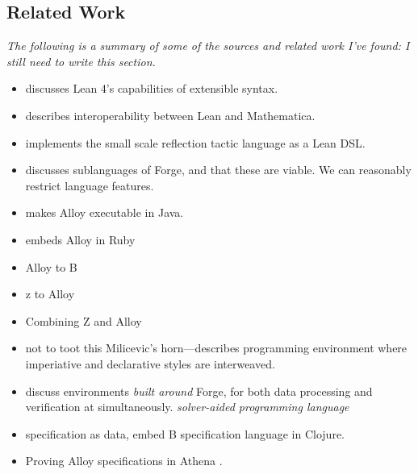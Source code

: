 \subsection{Related Work}
\emph{The following is a summary of some of the sources and related work I've found: I still need to write this section.}
\begin{itemize}
    \item \cite{ullrich2022beyond} discusses Lean 4's capabilities of extensible syntax. 
    \item \cite{lewis2022bi} describes interoperability between Lean and Mathematica. 
    \item \cite{gladshtein2024small} implements the small scale reflection tactic language as a Lean DSL. 
    \item \cite{ngpdbccdlrrvwwk-oopsla-2024} discusses sublanguages of Forge, and that these are viable. We can reasonably restrict language features. 
    \item \cite{milicevic2010executable} makes Alloy executable in Java. 
    \item \cite{milicevic2014alpha} embeds Alloy in Ruby
    \item \cite{krings2018translation} Alloy to B 
    \item \cite{malik2010translating} z to Alloy
    \item \cite{mikhailov2002approach} Combining Z and Alloy
    \item \cite{milicevic2015advancing} not to toot this Milicevic's horn---describes programming environment where imperiative and declarative styles are interweaved. 
    \item \cite{st2023comparison} discuss environments \emph{built around} Forge, for both data processing and verification at simultaneously. \emph{solver-aided programming language}
    \item \cite{korner2022embedding} specification as data, embed B specification language in Clojure. 
    \item \cite{arkoudas2004integrating} Proving Alloy specifications in Athena \cite{arkoudas2000denotational,musser2003proving}.
\end{itemize}
